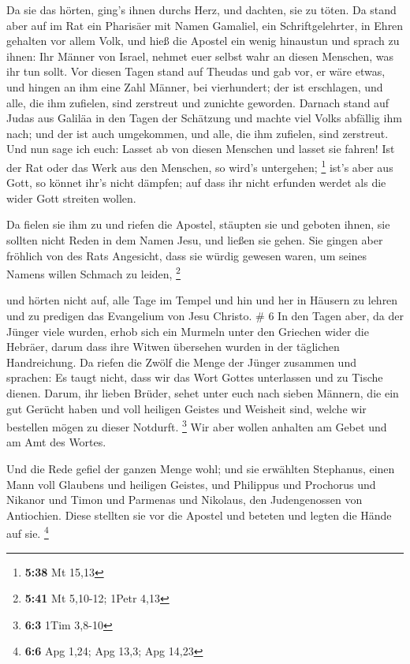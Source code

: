  Da sie das hörten, ging's ihnen durchs Herz, und dachten,
sie zu töten.  Da stand aber auf im Rat ein Pharisäer mit
Namen Gamaliel, ein Schriftgelehrter, in Ehren gehalten vor allem Volk,
und hieß die Apostel ein wenig hinaustun  und sprach zu
ihnen: Ihr Männer von Israel, nehmet euer selbst wahr an diesen
Menschen, was ihr tun sollt.  Vor diesen Tagen stand auf
Theudas und gab vor, er wäre etwas, und hingen an ihm eine Zahl Männer,
bei vierhundert; der ist erschlagen, und alle, die ihm zufielen, sind
zerstreut und zunichte geworden.  Darnach stand auf Judas
aus Galiläa in den Tagen der Schätzung und machte viel Volks abfällig
ihm nach; und der ist auch umgekommen, und alle, die ihm zufielen, sind
zerstreut.  Und nun sage ich euch: Lasset ab von diesen
Menschen und lasset sie fahren! Ist der Rat oder das Werk aus den
Menschen, so wird's untergehen; \footnote{\textbf{5:38} Mt 15,13}
 ist's aber aus Gott, so könnet ihr's nicht dämpfen; auf
dass ihr nicht erfunden werdet als die wider Gott streiten wollen.

 Da fielen sie ihm zu und riefen die Apostel, stäupten sie
und geboten ihnen, sie sollten nicht Reden in dem Namen Jesu, und ließen
sie gehen.  Sie gingen aber fröhlich von des Rats
Angesicht, dass sie würdig gewesen waren, um seines Namens willen
Schmach zu leiden, \footnote{\textbf{5:41} Mt 5,10-12; 1Petr 4,13}

 und hörten nicht auf, alle Tage im Tempel und hin und her
in Häusern zu lehren und zu predigen das Evangelium von Jesu Christo. \#
6  In den Tagen aber, da der Jünger viele wurden, erhob sich
ein Murmeln unter den Griechen wider die Hebräer, darum dass ihre Witwen
übersehen wurden in der täglichen Handreichung.  Da riefen
die Zwölf die Menge der Jünger zusammen und sprachen: Es taugt nicht,
dass wir das Wort Gottes unterlassen und zu Tische dienen. 
Darum, ihr lieben Brüder, sehet unter euch nach sieben Männern, die ein
gut Gerücht haben und voll heiligen Geistes und Weisheit sind, welche
wir bestellen mögen zu dieser Notdurft. \footnote{\textbf{6:3} 1Tim
  3,8-10}  Wir aber wollen anhalten am Gebet und am Amt des
Wortes.

 Und die Rede gefiel der ganzen Menge wohl; und sie
erwählten Stephanus, einen Mann voll Glaubens und heiligen Geistes, und
Philippus und Prochorus und Nikanor und Timon und Parmenas und Nikolaus,
den Judengenossen von Antiochien.  Diese stellten sie vor
die Apostel und beteten und legten die Hände auf sie. \footnote{\textbf{6:6}
  Apg 1,24; Apg 13,3; Apg 14,23}

